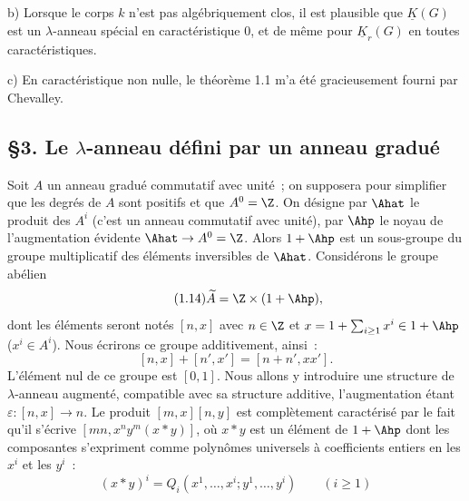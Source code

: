 b)
Lorsque le corps $k$ n'est pas algébriquement clos, il est plausible que $\underline{K}(G)$ est un $\lambda$-anneau spécial en caractéristique $0$, et de même pour $\underline{K}_r(G)$ en toutes caractéristiques.

c) En caractéristique non nulle, le théorème 1.1 m'a été gracieusement fourni par Chevalley.

\subsection*{\S 3. Le $\lambda$-anneau défini par un anneau gradué}

Soit $A$ un anneau gradué commutatif avec unité~; on supposera pour simplifier que les degrés de $A$ sont positifs et que $A^0=\Z$. On désigne par $\Ahat$ le produit des $A^i$ (c'est un anneau commutatif avec unité), par $\Ahp$ le noyau de l'augmentation évidente $\Ahat\to A^0=\Z$. Alors $1+\Ahp$ est un sous-groupe du groupe multiplicatif des éléments inversibles de $\Ahat$. Considérons le groupe abélien
\begin{equation}\tag{1.14}
\widetilde A=\Z\times(1+\Ahp),
\end{equation}
dont les éléments seront notés $[n,x]$ avec $n\in\Z$ et $x=1+\sum_{i\geq 1}x^i\in1+\Ahp$ ($x^i\in A^i$). Nous écrirons ce groupe additivement, ainsi~:
\begin{equation}\tag{1.15}
[n,x]+[n',x']=[n+n',xx'].
\end{equation}
L'élément nul de ce groupe est $[0,1]$. Nous allons y introduire une structure de $\lambda$-anneau augmenté, compatible avec sa structure additive, l'augmentation étant $\varepsilon:[n,x]\longrightarrow n$. Le produit $[m,x][n,y]$ est complètement caractérisé par le fait qu'il s'écrive $[mn,x^n y^m(x*y)]$, où $x*y$ est un élément de $1+\Ahp$ dont les composantes s'expriment comme polynômes universels à coefficients entiers en les $x^i$ et les $y^i$~:
\begin{equation}\tag{1.16}
(x*y)^i=Q_i(x^1,\ldots,x^i;y^1,\ldots,y^i)\qquad (i\geq1)
\end{equation}
